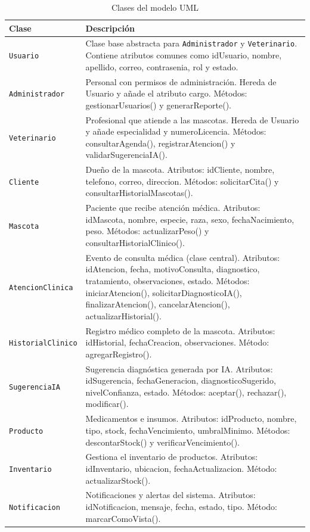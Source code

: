 \documentclass[12pt,a4paper]{article}
\begin{document}
\begin{table}[H]
    \centering
    \caption{Clases del modelo UML}
    \label{tab:clases}
    \begin{tabular}{|p{3cm}|p{9cm}|}
        \hline
        \textbf{Clase} & \textbf{Descripción} \\
        \hline
        \texttt{Usuario} & Clase base abstracta para \texttt{Administrador} y \texttt{Veterinario}. Contiene atributos comunes como idUsuario, nombre, apellido, correo, contrasenia, rol y estado. \\
        \texttt{Administrador} & Personal con permisos de administración. Hereda de Usuario y añade el atributo cargo. Métodos: gestionarUsuarios() y generarReporte(). \\
        \texttt{Veterinario} & Profesional que atiende a las mascotas. Hereda de Usuario y añade especialidad y numeroLicencia. Métodos: consultarAgenda(), registrarAtencion() y validarSugerenciaIA(). \\
        \texttt{Cliente} & Dueño de la mascota. Atributos: idCliente, nombre, telefono, correo, direccion. Métodos: solicitarCita() y consultarHistorialMascotas(). \\
        \texttt{Mascota} & Paciente que recibe atención médica. Atributos: idMascota, nombre, especie, raza, sexo, fechaNacimiento, peso. Métodos: actualizarPeso() y consultarHistorialClinico(). \\
        \texttt{AtencionClinica} & Evento de consulta médica (clase central). Atributos: idAtencion, fecha, motivoConsulta, diagnostico, tratamiento, observaciones, estado. Métodos: iniciarAtencion(), solicitarDiagnosticoIA(), finalizarAtencion(), cancelarAtencion(), actualizarHistorial(). \\
        \texttt{HistorialClinico} & Registro médico completo de la mascota. Atributos: idHistorial, fechaCreacion, observaciones. Método: agregarRegistro(). \\
        \texttt{SugerenciaIA} & Sugerencia diagnóstica generada por IA. Atributos: idSugerencia, fechaGeneracion, diagnosticoSugerido, nivelConfianza, estado. Métodos: aceptar(), rechazar(), modificar(). \\
        \texttt{Producto} & Medicamentos e insumos. Atributos: idProducto, nombre, tipo, stock, fechaVencimiento, umbralMinimo. Métodos: descontarStock() y verificarVencimiento(). \\
        \texttt{Inventario} & Gestiona el inventario de productos. Atributos: idInventario, ubicacion, fechaActualizacion. Método: actualizarStock(). \\
        \texttt{Notificacion} & Notificaciones y alertas del sistema. Atributos: idNotificacion, mensaje, fecha, estado, tipo. Método: marcarComoVista(). \\
        \hline
    \end{tabular}
\end{table}
\end{document}

